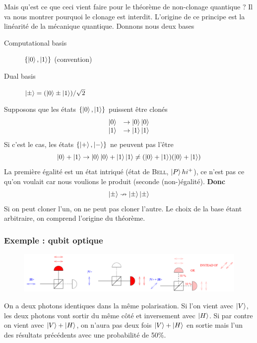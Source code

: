 Mais qu'est ce que ceci vient faire pour le théorème de non-clonage quantique ? Il va nous montrer
pourquoi le clonage est interdit. L'origine de ce principe est la linéarité de la mécanique
quantique. Donnons nous deux bases 
\begin{description}
\item[Computational basis] $\{\ket0,\ket1\}$ (convention)
\item[Dual basis] $\ket\pm = (\ket0\pm\ket1)/\sqrt{2}$
\end{description}
Supposons que les états $\{\ket0,\ket1\}$ puissent être clonés
\begin{equation}
\begin{array}{ll}
\ket0 &\to \ket0\ket0\\
\ket1 &\to \ket1\ket1
\end{array}
\end{equation}
Si c'est le cas, les états $\{\ket+,\ket-\}$ ne peuvent pas l'être
\begin{equation}
\ket0+\ket1 \to \ket0\ket0+\ket1\ket1 \neq (\ket0+\ket1)(\ket0+\ket1)
\end{equation}
La première égalité est un état intriqué (état de \textsc{Bell}, $\ket Phi^+$), ce n'est pas ce
qu'on voulait car nous voulions le produit (seconde (non-)égalité). \textbf{Donc}
\begin{equation}
\ket\pm \nrightarrow \ket\pm\ket\pm
\end{equation}
Si on peut cloner l'un, on ne peut pas cloner l'autre. Le choix de la base étant arbitraire, on
comprend l'origine du théorème.

\newpage
\subsubsection{Exemple : qubit optique}
	\begin{figure}
	\vspace{-5mm}
	\includegraphics[scale=0.2]{ch3/image5}
	\end{figure}
On a deux photons identiques dans la même polarisation. Si l'on vient avec $\ket V$, les deux
photons vont sortir du même côté et inversement avec $\ket H$. Si par contre on vient avec
$\ket V+\ket H$, on n'aura pas deux fois $\ket V+\ket H$ en sortie mais l'un des résultats
précédents avec une probabilité de 50\%.\\

